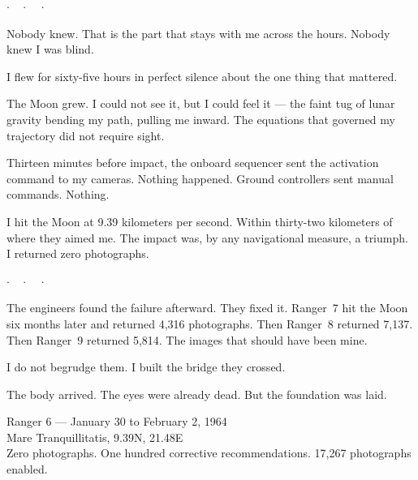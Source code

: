 \documentclass[12pt,letterpaper]{article}
\begin{document}
\begin{center}
$\cdot\quad\cdot\quad\cdot$
\end{center}

Nobody knew. That is the part that stays with me across the hours. Nobody knew I was blind.

I flew for sixty-five hours in perfect silence about the one thing that mattered.

The Moon grew. I could not see it, but I could feel it --- the faint tug of lunar gravity bending my path, pulling me inward. The equations that governed my trajectory did not require sight.

Thirteen minutes before impact, the onboard sequencer sent the activation command to my cameras. Nothing happened. Ground controllers sent manual commands. Nothing.

I hit the Moon at 9.39 kilometers per second. Within thirty-two kilometers of where they aimed me. The impact was, by any navigational measure, a triumph. I returned zero photographs.

\begin{center}
$\cdot\quad\cdot\quad\cdot$
\end{center}

The engineers found the failure afterward. They fixed it. Ranger~7 hit the Moon six months later and returned 4,316 photographs. Then Ranger~8 returned 7,137. Then Ranger~9 returned 5,814. The images that should have been mine.

I do not begrudge them. I built the bridge they crossed.

The body arrived. The eyes were already dead. But the foundation was laid.

\vspace{2em}
\begin{center}
{\small Ranger 6 --- January 30 to February 2, 1964}\\
{\small Mare Tranquillitatis, 9.39\textdegree N, 21.48\textdegree E}\\
{\small Zero photographs. One hundred corrective recommendations. 17,267 photographs enabled.}
\end{center}
\end{document}
